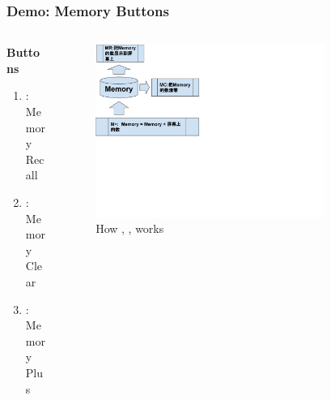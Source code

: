 \documentclass[
	11pt, %
]{beamer}
\begin{document}
\begin{frame}
	\frametitle{Demo: Memory Buttons}
	\begin{columns}[t]
			\begin{column}{0.2\textwidth}
				\textbf{Buttons}
				\begin{enumerate}
				\item {}: Memory Recall
				\item {}: Memory Clear
				\item {}: Memory Plus
			\end{enumerate}
			\end{column}

			\begin{column}{0.8\textwidth}
			   \begin{figure}
				    \includegraphics[width=0.8\textwidth, natwidth=610,natheight=642]{Memory_Buttons_How.svg}
				    \caption{How , ,  works}
			    \end{figure}
			\end{column}
		\end{columns}
\end{frame}

\end{document}
